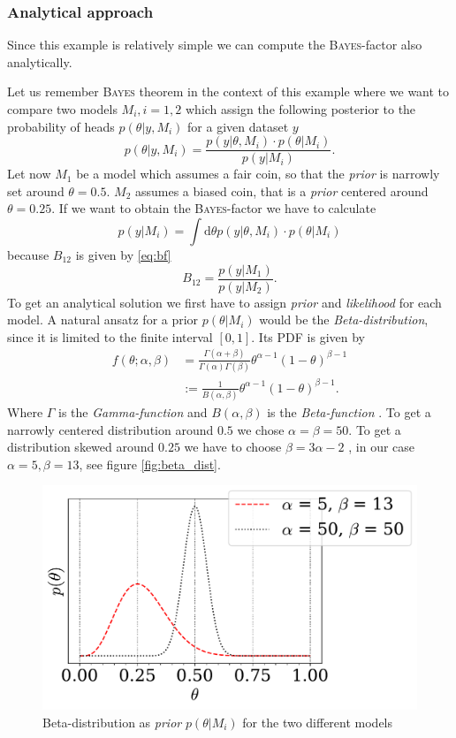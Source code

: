 \documentclass[%
 reprint,
 amsmath,amssymb,
 aps,
]{revtex4-1}
\begin{document}
\subsubsection{\textbf{Analytical approach}}
\noindent Since this example is relatively simple we can compute the \textsc{Bayes}-factor also analytically.

Let us remember \textsc{Bayes} theorem in the context of this example where we want to compare two models $M_i,i=1,2$ which assign the following posterior to the probability of heads $p(\theta|y,M_i)$ for a given dataset $y$
$$p(\theta|y,M_i)=\frac{p(y|\theta,M_i)\cdot p(\theta|M_i)}{p(y|M_i)}.$$
Let now $M_1$ be a model which assumes a fair coin, so that the \emph{prior} is narrowly set around $\theta=0.5$. $M_2$ assumes a biased coin, that is a \emph{prior} centered around $\theta =0.25$. If we want to obtain the \textsc{Bayes}-factor we have to calculate $$p(y|M_i)=\int \text{d}\theta p(y|\theta,M_i)\cdot p(\theta|M_i) $$
because $B_{12}$ is given by \eqref{eq:bf} $$B_{12}=\frac{p(y|M_1)}{p(y|M_2)}.$$
To get an analytical solution we first have to assign \emph{prior} and \emph{likelihood} for each model. A natural ansatz for a prior $p(\theta|M_i)$ would be the \emph{Beta-distribution}, since it is limited to the finite interval $[0,1]$. Its PDF is given by \cite{kormaz} \begin{align*}f(\theta;\alpha,\beta)&=\frac{\Gamma(\alpha+\beta)}{\Gamma(\alpha)\Gamma(\beta)}\theta^{\alpha-1}(1-\theta)^{\beta-1}\\&:=\frac{1}{B(\alpha,\beta)}\theta^{\alpha-1}(1-\theta)^{\beta-1}.
\end{align*}
Where $\Gamma$ is the \emph{Gamma-function} \cite{gamma_function} and $B(\alpha,\beta)$ is the \emph{Beta-function} \cite{beta_function}.
To get a narrowly centered distribution around $0.5$ we chose $\alpha=\beta=50$. To get a distribution skewed around $0.25$ we have to choose $\beta=3\alpha-2$ \cite{wiki}, in our case $\alpha=5,\beta=13$, see figure \eqref{fig:beta_dist}.
\begin{figure}[htbp]
	\centering
	\includegraphics[width=\linewidth]{beta_dist}
	\caption{Beta-distribution as \emph{prior} $p(\theta|M_i)$ for the two different models}
	\label{fig:beta_dist}
\end{figure}
\end{document}
